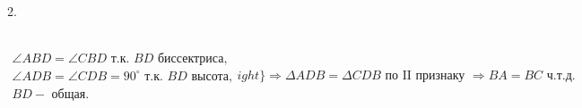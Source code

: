 2.  \begin{figure}[ht!]
\end{figure}\\
$\left.\begin{array}{l}\angle ABD=\angle CBD\text{ т.к. }BD\text{ биссектриса,}\\
\angle ADB=\angle CDB=90^\circ \text{ т.к. }BD\text{ высота,}\\
BD - \text{ общая.}   \end{array}
ight\}\Rightarrow
\Delta ADB=\Delta CDB\text{ по II признаку }\Rightarrow BA=BC\text{ ч.т.д.} $\\
